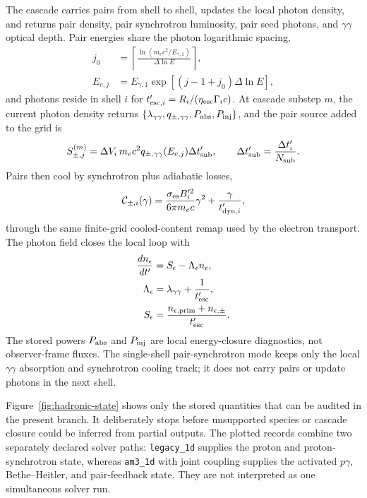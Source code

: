 \documentclass[twocolumn]{aastex702}
\begin{document}
The cascade carries pairs from shell to shell, updates the local photon density,
and returns pair density, pair synchrotron luminosity, pair seed photons, and
\(\gamma\gamma\) optical depth.  Pair energies share the photon logarithmic
spacing,
\begin{equation}
\begin{aligned}
j_0&=\left\lceil\frac{\ln(m_ec^2/E_{\gamma,1})}{\Delta\ln E}\right\rceil,
\\
E_{e,j}&=E_{\gamma,1}\exp[(j-1+j_0)\Delta\ln E],
\end{aligned}
\end{equation}
and photons reside in shell \(i\) for
\(t'_{{\rm esc},i}=R_i/(\eta_{\rm esc}\Gamma_i c)\).  At cascade substep \(m\),
the current photon density returns
\(\{\lambda_{\gamma\gamma},q_{\pm,\gamma\gamma},P_{\rm abs},P_{\rm inj}\}\), and
the pair source added to the grid is
\begin{equation}
S_{\pm,j}^{(m)}=
\Delta V_i\,m_ec^2q_{\pm,\gamma\gamma}(E_{e,j})\Delta t'_{\rm sub},
\qquad
\Delta t'_{\rm sub}=\frac{\Delta t'_i}{N_{\rm sub}} .
\end{equation}
Pairs then cool by synchrotron plus adiabatic losses,
\begin{equation}
\mathcal C_{\pm,i}(\gamma)=
\frac{\sigma_{\rm es}B_i^{\prime2}}{6\pi m_ec}\gamma^2
+\frac{\gamma}{t'_{{\rm dyn},i}},
\end{equation}
through the same finite-grid cooled-content remap used by the electron transport.
The photon field closes the local loop with
\begin{equation}
\begin{aligned}
\frac{dn_\epsilon}{dt'}&=S_\epsilon-\Lambda_\epsilon n_\epsilon,
\\
\Lambda_\epsilon&=\lambda_{\gamma\gamma}+\frac{1}{t'_{\rm esc}},\\
S_\epsilon&=\frac{n_{\epsilon,{\rm prim}}+n_{\epsilon,\pm}}{t'_{\rm esc}}.
\end{aligned}
\end{equation}
The stored powers \(P_{\rm abs}\) and \(P_{\rm inj}\) are local energy-closure
diagnostics, not observer-frame fluxes.  The single-shell pair-synchrotron mode
keeps only the local \(\gamma\gamma\) absorption and synchrotron cooling track; it
does not carry pairs or update photons in the next shell.

Figure~\ref{fig:hadronic-state} shows only the stored quantities that can be
audited in the present branch.  It deliberately stops before unsupported
species or cascade closure could be inferred from partial outputs.  The plotted
records combine two separately declared solver paths: \texttt{legacy\_1d}
supplies the proton and proton-synchrotron state, whereas
\texttt{am3\_1d} with joint coupling supplies the activated \(p\gamma\),
Bethe--Heitler, and pair-feedback state.  They are not interpreted as one
simultaneous solver run.
\end{document}
